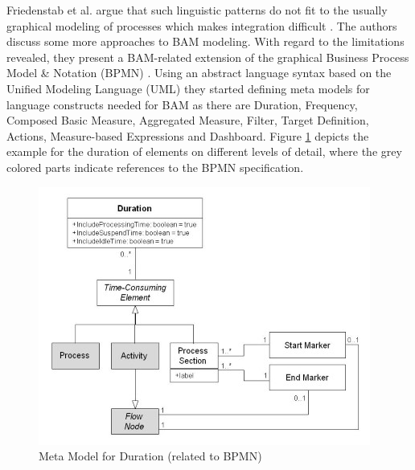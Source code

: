 Friedenstab et al. argue that such linguistic patterns do not fit to the usually graphical modeling of processes which makes integration difficult \cite{article:BPMNActivityMon}. The authors discuss some more approaches to BAM modeling. With regard to the limitations revealed, they present a BAM-related extension of the graphical Business Process Model & Notation (BPMN) \cite{article:BPMNActivityMon}.
Using an abstract language syntax based on the Unified Modeling Language (UML) they started defining meta models for language constructs needed for BAM as there are Duration, Frequency, Composed Basic Measure, Aggregated Measure, Filter, Target Definition, Actions, Measure-based Expressions and Dashboard. Figure \ref{fig:Meta-Model} depicts the example for the duration of elements on different levels of detail, where the grey colored parts indicate references to the BPMN specification.

\begin{figure}[h]
	\centering
	\includegraphics[width=0.9\linewidth]{Figures/Chapter5/Monitoring/Meta-Mode-fo-Duration-relate-to-BPMN-1.jpg}
	\caption[Meta Model for Duration (related to BPMN) 12]{Meta Model for Duration (related to BPMN) \cite{article:BPMNActivityMon}}
	\label{fig:Meta-Model}
\end{figure}


